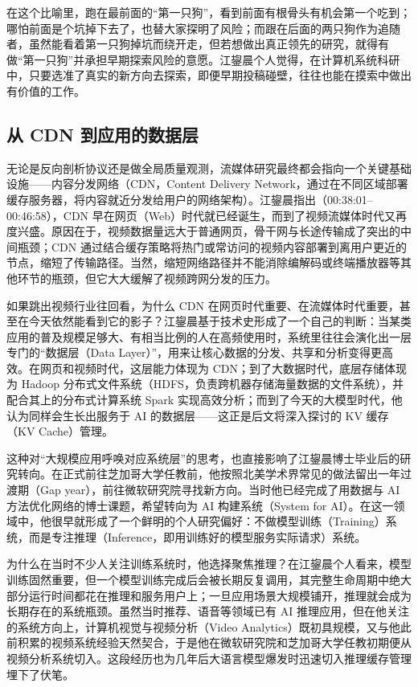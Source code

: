 \documentclass[UTF8,a4paper,11pt,fontset=fandol]{ctexart}
\begin{document}
在这个比喻里，跑在最前面的“第一只狗”，看到前面有根骨头有机会第一个吃到；哪怕前面是个坑掉下去了，也替大家探明了风险；而跟在后面的两只狗作为追随者，虽然能看着第一只狗掉坑而绕开走，但若想做出真正领先的研究，就得有做“第一只狗”并承担早期探索风险的意愿。江鋆晨个人觉得，在计算机系统科研中，只要选准了真实的新方向去探索，即便早期投稿碰壁，往往也能在摸索中做出有价值的工作。

\subsection{从 CDN 到应用的数据层}
无论是反向剖析协议还是做全局质量观测，流媒体研究最终都会指向一个关键基础设施——内容分发网络（CDN，Content Delivery Network，通过在不同区域部署缓存服务器，将内容就近分发给用户的网络架构）。江鋆晨指出（00:38:01–00:46:58），CDN 早在网页（Web）时代就已经诞生，而到了视频流媒体时代又再度兴盛。原因在于，视频数据量远大于普通网页，骨干网与长途传输成了突出的中间瓶颈；CDN 通过结合缓存策略将热门或常访问的视频内容部署到离用户更近的节点，缩短了传输路径。当然，缩短网络路径并不能消除编解码或终端播放器等其他环节的瓶颈，但它大大缓解了视频跨网分发的压力。

如果跳出视频行业往回看，为什么 CDN 在网页时代重要、在流媒体时代重要，甚至在今天依然能看到它的影子？江鋆晨基于技术史形成了一个自己的判断：当某类应用的普及规模足够大、有相当比例的人在高频使用时，系统里往往会演化出一层专门的“数据层（Data Layer）”，用来让核心数据的分发、共享和分析变得更高效。在网页和视频时代，这层能力体现为 CDN；到了大数据时代，底层存储体现为 Hadoop 分布式文件系统（HDFS，负责跨机器存储海量数据的文件系统），并配合其上的分布式计算系统 Spark 实现高效分析；而到了今天的大模型时代，他认为同样会生长出服务于 AI 的数据层——这正是后文将深入探讨的 KV 缓存（KV Cache）管理。

这种对“大规模应用呼唤对应系统层”的思考，也直接影响了江鋆晨博士毕业后的研究转向。在正式前往芝加哥大学任教前，他按照北美学术界常见的做法留出一年过渡期（Gap year），前往微软研究院寻找新方向。当时他已经完成了用数据与 AI 方法优化网络的博士课题，希望转向为 AI 构建系统（System for AI）。在这一领域中，他很早就形成了一个鲜明的个人研究偏好：不做模型训练（Training）系统，而是专注推理（Inference，即用训练好的模型服务实际请求）系统。

为什么在当时不少人关注训练系统时，他选择聚焦推理？在江鋆晨个人看来，模型训练固然重要，但一个模型训练完成后会被长期反复调用，其完整生命周期中绝大部分运行时间都花在推理和服务用户上；一旦应用场景大规模铺开，推理就会成为长期存在的系统瓶颈。虽然当时推荐、语音等领域已有 AI 推理应用，但在他关注的系统方向上，计算机视觉与视频分析（Video Analytics）既初具规模，又与他此前积累的视频系统经验天然契合，于是他在微软研究院和芝加哥大学任教初期便从视频分析系统切入。这段经历也为几年后大语言模型爆发时迅速切入推理缓存管理埋下了伏笔。
\end{document}
